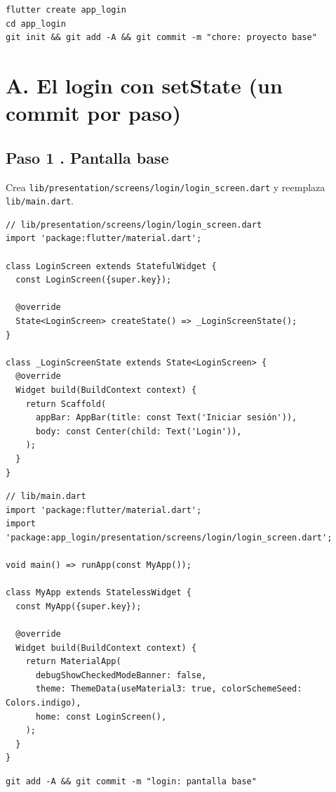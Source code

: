 \documentclass[11pt,a4paper,oneside]{book}
\newcommand{\file}[1]{\texttt{\textcolor{brandDark}{#1}}}
\begin{document}
\begin{lstlisting}[language={},numbers=none]
flutter create app_login
cd app_login
git init && git add -A && git commit -m "chore: proyecto base"
\end{lstlisting}

\section*{A. El login con setState (un commit por paso)}

\subsection*{Paso 1 . Pantalla base}
\begin{wherebox}
Crea \file{lib/presentation/screens/login/login\_screen.dart} y reemplaza
\file{lib/main.dart}.
\end{wherebox}

\begin{lstlisting}
// lib/presentation/screens/login/login_screen.dart
import 'package:flutter/material.dart';

class LoginScreen extends StatefulWidget {
  const LoginScreen({super.key});

  @override
  State<LoginScreen> createState() => _LoginScreenState();
}

class _LoginScreenState extends State<LoginScreen> {
  @override
  Widget build(BuildContext context) {
    return Scaffold(
      appBar: AppBar(title: const Text('Iniciar sesión')),
      body: const Center(child: Text('Login')),
    );
  }
}
\end{lstlisting}

\begin{lstlisting}
// lib/main.dart
import 'package:flutter/material.dart';
import 'package:app_login/presentation/screens/login/login_screen.dart';

void main() => runApp(const MyApp());

class MyApp extends StatelessWidget {
  const MyApp({super.key});

  @override
  Widget build(BuildContext context) {
    return MaterialApp(
      debugShowCheckedModeBanner: false,
      theme: ThemeData(useMaterial3: true, colorSchemeSeed: Colors.indigo),
      home: const LoginScreen(),
    );
  }
}
\end{lstlisting}

\begin{lstlisting}[language={},numbers=none]
git add -A && git commit -m "login: pantalla base"
\end{lstlisting}
\end{document}
